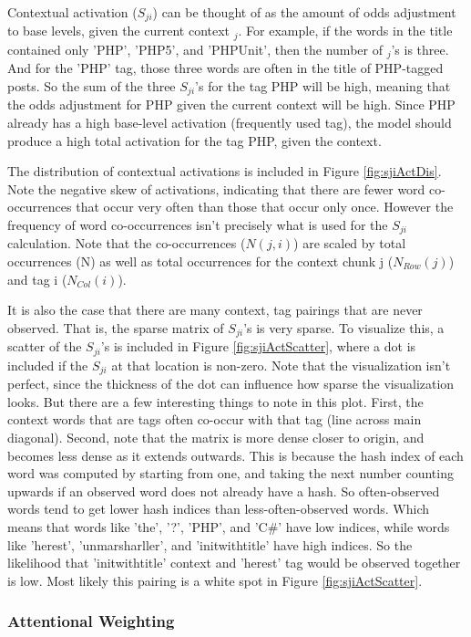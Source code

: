 \documentclass[10pt,letterpaper]{article}
\begin{document}
Contextual activation ($S_{ji}$) can be thought of as the amount of odds adjustment to base levels, given the current context $_{j}$.
For example, if the words in the title contained only 'PHP', 'PHP5', and 'PHPUnit', then the number of $_{j}$'s is three.
And for the 'PHP' tag, those three words are often in the title of PHP-tagged posts.
So the sum of the three $S_{ji}$'s for the tag PHP will be high, meaning that the odds adjustment for PHP given the current context will be high.
Since PHP already has a high base-level activation (frequently used tag), the model should produce a high total activation for the tag PHP, given the context.

The distribution of contextual activations is included in Figure \ref{fig:sjiActDis}.
Note the negative skew of activations, indicating that there are fewer word co-occurrences that occur very often than those that occur only once.
However the frequency of word co-occurrences isn't precisely what is used for the $S_{ji}$ calculation.
Note that the co-occurrences ($N(j,i)$) are scaled by total occurrences (N) as well as total occurrences for the context chunk j ($N_{Row}(j)$) and tag i ($N_{Col}(i)$).

It is also the case that there are many context, tag pairings that are never observed.
That is, the sparse matrix of $S_{ji}$'s is very sparse.
To visualize this, a scatter of the $S_{ji}$'s is included in Figure \ref{fig:sjiActScatter}, where a dot is included if the $S_{ji}$ at that location is non-zero.
Note that the visualization isn't perfect, since the thickness of the dot can influence how sparse the visualization looks.
But there are a few interesting things to note in this plot.
First, the context words that are tags often co-occur with that tag (line across main diagonal).
Second, note that the matrix is more dense closer to origin, and becomes less dense as it extends outwards.
This is because the hash index of each word was computed by starting from one, and taking the next number counting upwards if an observed word does not already have a hash.
So often-observed words tend to get lower hash indices than less-often-observed words.
Which means that words like 'the', '?', 'PHP', and 'C\#' have low indices, while words like 'herest', 'unmarsharller', and 'initwithtitle' have high indices.
So the likelihood that 'initwithtitle' context and 'herest' tag would be observed together is low. Most likely this pairing is a white spot in Figure \ref{fig:sjiActScatter}.


\subsubsection{Attentional Weighting}
\end{document}
